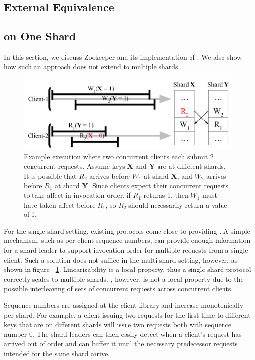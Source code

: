 \subsection{External Equivalence}
\label{sec:mdl:equivalence}

\subsection{\MDL{} on One Shard}
\label{sec:mdl:single-shard}

In this section, we discuss Zookeeper and its implementation of \SDL{}.
We also show how such an approach does not extend to multiple shards.

\begin{figure}[!htb]
    \includegraphics[scale=.45]{somet.png}
    \caption{Example execution where two concurrent clients each submit 2 concurrent requests. Assume keys \textbf{X} and \textbf{Y} are at different shards. It is possible that $R_2$ arrives before $W_1$ at shard \textbf{X}, and $W_2$ arrives before $R_1$ at shard \textbf{Y}. Since clients expect their concurrent requests to take affect in invocation order, if $R_1$ returns 1, then $W_1$ must have taken affect before $R_1$, so $R_2$ should necessarily return a value of 1.}
    \label{fig:concurrentbatches}
\end{figure}

For the single-shard setting, existing protocols come close to providing \MDL{}. A simple mechanism, such as per-client sequence numbers, can provide enough information for a shard leader to support invocation order for multiple requests from a single client. Such a solution does not suffice in the multi-shard setting, however, as shown in figure ~\ref{fig:concurrentbatches}. Linearizability is a local property, thus a single-shard protocol correctly scales to multiple shards. \MDL{}, however, is not a local property due to the possible interleaving of sets of concurrent requests across concurrent clients.

Sequence numbers are assigned at the client library 
and increase monotonically per shard. For example, a client issuing two requests for the first time to different keys that are on different shards will issue two requests both with sequence number 0. The shard leaders can then easily detect when a client's request
has arrived out of order and can buffer it until the necessary predecessor requests intended for the same shard arrive.

